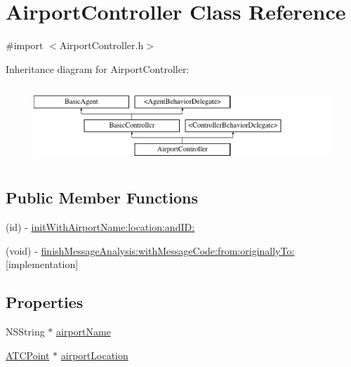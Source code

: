 \hypertarget{interface_airport_controller}{
\section{\-Airport\-Controller \-Class \-Reference}
\label{interface_airport_controller}
}


{\ttfamily \#import $<$\-Airport\-Controller.\-h$>$}

\-Inheritance diagram for \-Airport\-Controller\-:\begin{figure}[H]
\begin{center}
\leavevmode
\includegraphics[height=2.931937cm]{interface_airport_controller}
\end{center}
\end{figure}
\subsection*{\-Public \-Member \-Functions}
\begin{DoxyCompactItemize}
\item 
(id) -\/ \hyperlink{interface_airport_controller_aea5cca35271e003b83bd175641e7ef5e}{init\-With\-Airport\-Name\-:location\-:and\-I\-D\-:}
\item 
(void) -\/ \hyperlink{interface_airport_controller_a2ad69d5a18599af2989c8503daa402c7}{finish\-Message\-Analysis\-:with\-Message\-Code\-:from\-:originally\-To\-:}{\ttfamily  \mbox{[}implementation\mbox{]}}
\end{DoxyCompactItemize}
\subsection*{\-Properties}
\begin{DoxyCompactItemize}
\item 
\-N\-S\-String $\ast$ \hyperlink{interface_airport_controller_aa5c51181e127f9b4ccbb502d8916b114}{airport\-Name}
\item 
\hyperlink{interface_a_t_c_point}{\-A\-T\-C\-Point} $\ast$ \hyperlink{interface_airport_controller_ad6a7fdc0a276639ab840c6e8066069aa}{airport\-Location}
\end{DoxyCompactItemize}



